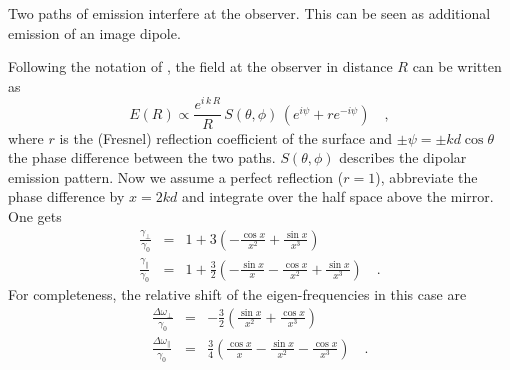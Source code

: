 \begin{marginfigure}
\caption{Two paths of emission interfere at the observer. This can be seen as additional emission of an image dipole.}
\end{marginfigure}

Following the notation of \cite{Langguth16}, the field at the observer in distance $R$ can be written as
\begin{equation}
E(R) \propto \frac{e^{i \, k \, R}}{R} \, S(\theta, \phi) \, \left( e^{i \psi} + r  e^{- i \psi} \right) \quad ,
\end{equation}
where $r$ is the (Fresnel) reflection coefficient of the surface and $\pm \psi = \pm k d \cos \theta$ the phase difference between the two paths. $S(\theta, \phi)$ describes the dipolar emission pattern. Now we assume a perfect reflection ($r=1$), abbreviate  the phase difference by $x = 2 k d$ and integrate over the half space above the mirror. One gets
\begin{eqnarray}
 \frac{\gamma_\perp }{\gamma_0} & = & 1 + 3 \left( - \frac{\cos x}{x^2} + \frac{\sin x}{x^3} \right) \\
  \frac{\gamma_\parallel }{\gamma_0} & = & 1 + \frac{3}{2} \left( - \frac{\sin x}{x} - \frac{\cos x}{x^2}  + \frac{\sin x}{x^3} \right)  \quad .
\end{eqnarray}
For completeness, the relative shift of the eigen-frequencies in this case are
\begin{eqnarray}
 \frac{\Delta \omega_\perp }{\gamma_0} & = & - \frac{3}{2} \left(  \frac{\sin x}{x^2} + \frac{\cos x}{x^3} \right) \\
  \frac{\Delta \omega_\parallel }{\gamma_0} & = & \frac{3}{4} \left(  \frac{\cos x}{x} - \frac{\sin x}{x^2}  - \frac{\cos x}{x^3} \right)  \quad .
\end{eqnarray}





\printbibliography[segment=\therefsegment,heading=subbibliography]
